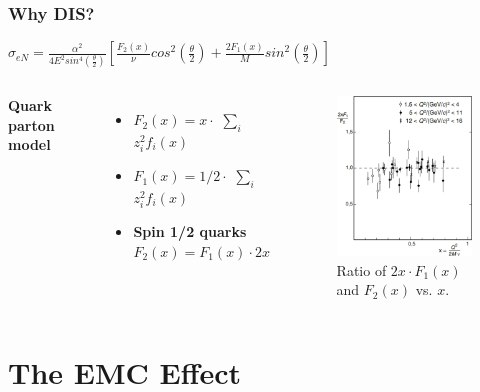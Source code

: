 \documentclass[12pt,usenames,dvipsnames]{beamer}
\begin{document}
\begin{frame}
\frametitle{Why DIS?}
\vspace*{-15pt}
\centering
\large	$\sigma_{eN} = \frac{\alpha^2}{4E^2sin^4(\frac{\theta}{2})} [\frac{F_2(x)}{\nu}cos^2\left(\frac{\theta}{2}\right) + \frac{2F_1(x)}{M}sin^2\left(\frac{\theta}{2}\right)] $

\begin{columns}[c] %
	\textbf{Quark parton model}\\
\begin{itemize}
	\item $F_2(x) = x \cdot$ $\sum_{i}$ $z_i^2f_i(x) $
	\item $F_1(x) = 1/2 \cdot$ $\sum_{i}$ $z_i^2f_i(x)$
	\item  \textbf{Spin 1/2 quarks} $F_2(x) = F_1(x) \cdot2x$
\end{itemize}



\vspace*{-5pt}
\begin{figure}[t]
	\centering
	\includegraphics[width=4.5cm]{../images/Thesis/f1_f2_spin.pdf} 
	\caption*{Ratio of $2x\cdot F_1(x)$ and $F_2(x)$ vs. $x$. \cite{PnN}}
	
\end{figure}  
\end{columns}
\end{frame}

\section[EMC]{The EMC Effect}
\end{document}
